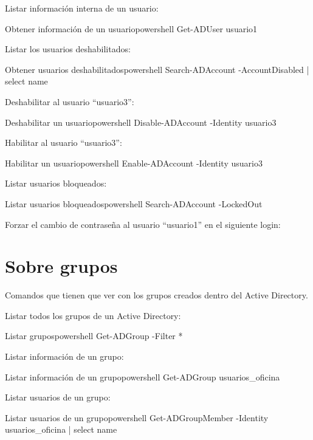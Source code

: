 Listar información interna de un usuario:
\begin{mycode}{Obtener información de un usuario}{powershell}{}
Get-ADUser usuario1
\end{mycode}

Listar los  usuarios deshabilitados:
\begin{mycode}{Obtener usuarios deshabilitados}{powershell}{}
Search-ADAccount -AccountDisabled | select name
\end{mycode}

Deshabilitar al usuario “usuario3”:
\begin{mycode}{Deshabilitar un usuario}{powershell}{}
Disable-ADAccount -Identity usuario3
\end{mycode}


Habilitar al usuario “usuario3”:
\begin{mycode}{Habilitar un usuario}{powershell}{}
Enable-ADAccount -Identity usuario3
\end{mycode}

Listar usuarios bloqueados:
\begin{mycode}{Listar usuarios bloqueados}{powershell}{}
Search-ADAccount -LockedOut
\end{mycode}

Forzar el cambio de contraseña al usuario “usuario1” en el siguiente login:


\section{Sobre grupos}
Comandos que tienen que ver con los grupos creados dentro del Active Directory.

Listar todos los grupos de un Active Directory:
\begin{mycode}{Listar grupos}{powershell}{}
Get-ADGroup -Filter *
\end{mycode}

Listar información de un grupo:
\begin{mycode}{Listar información de un grupo}{powershell}{}
Get-ADGroup usuarios_oficina
\end{mycode}

Listar usuarios de un grupo:
\begin{mycode}{Listar usuarios de un grupo}{powershell}{}
Get-ADGroupMember -Identity usuarios_oficina | select name
\end{mycode}


